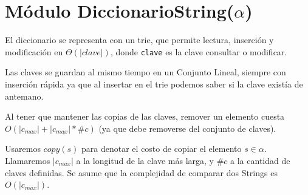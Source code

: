 \newcommand\dicString{diccString($\alpha$)}
\newcommand\itDicString{itDiccString($\alpha$)}
\renewcommand{\labelenumi}{(\Roman{enumi})}

\section{Módulo DiccionarioString(\texorpdfstring{$\alpha$}{α})}

El diccionario se representa con un trie, que permite lectura, inserción y modificación en $\Theta(|clave|)$, donde \texttt{clave} es la clave consultar o modificar.

Las claves se guardan al mismo tiempo en un Conjunto Lineal, siempre con inserción rápida ya que al insertar en el trie podemos saber si la clave existía de antemano.

Al tener que mantener las copias de las claves, remover un elemento cuesta $O(|c_{max}| + |c_{max}| * \#c)$ (ya que debe removerse del conjunto de claves).

Usaremos $copy(s)$ para denotar el costo de copiar el elemento $s \in \alpha$. Llamaremos $|c_{max}|$ a la longitud de la clave más larga, y $\#c$ a la cantidad de claves definidas. Se asume que la complejidad de comparar dos Strings es $O(|c_{max}|)$.

